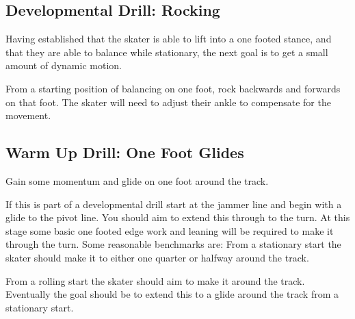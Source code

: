 \subsection*{Developmental Drill: Rocking}

Having established that the skater is able to lift into a one footed stance, and that they are able to balance while stationary, the next goal is to get a small amount of dynamic motion. 

From a starting position of balancing on one foot, rock backwards and forwards on that foot. 
The skater will need to adjust their ankle to compensate for the movement.


\subsection*{Warm Up Drill: One Foot Glides} 

Gain some momentum and glide on one foot around the track. 

If this is part of a developmental drill start at the jammer line and begin with a glide to the pivot line. 
You should aim to extend this through to the turn. 
At this stage some basic one footed edge work and leaning will be required to make it through the turn.   
Some reasonable benchmarks are: From a stationary start the skater should make it to either one quarter or halfway around the track. 

From a rolling start the skater should aim to make it around the track.
Eventually the goal should be to extend this to a glide around the track from a stationary start. 
